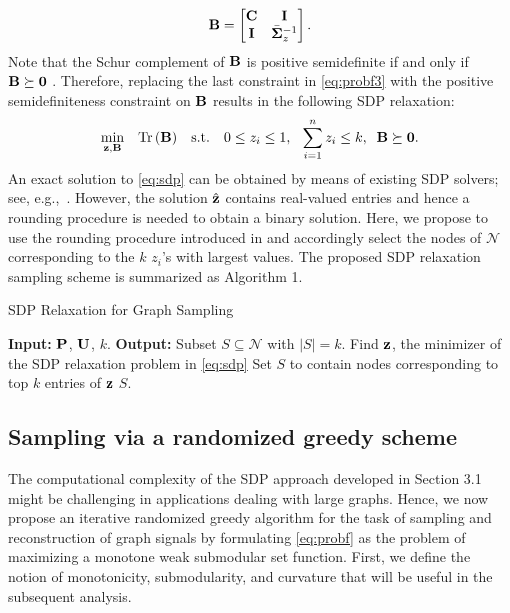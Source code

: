 %
\begin{equation}
\B = \begin{bmatrix}
    \C& \I\\
    \I & \bar{\S}_z^{-1}
\end{bmatrix}.
\end{equation}
%
Note that the Schur complement of $\B$ is positive semidefinite if and only if $\B\succeq \mathbf{0}$ 
\cite{horn2012matrix}. Therefore, replacing the last constraint in \ref{eq:probf3} with the positive semidefiniteness 
constraint on $\B$ results in the following SDP relaxation:
%
\begin{equation}\label{eq:sdp}
\begin{aligned}
& \underset{\z,\B}{\text{min}}
\quad \mathrm{Tr}\left(\B\right)
& \text{s.t.}\quad 0\leq z_i \leq 1, \phantom{k} \sum_{i=1}^nz_i \leq k, \phantom{k} \B \succeq \mathbf{0}.
\end{aligned}
\end{equation}
%
An exact solution to \ref{eq:sdp} can be obtained by means of existing SDP solvers; see, e.g.,~\cite{arora2005fast,grant2008cvx}.  However, the solution $\hat{\z}$ contains real-valued entries and hence a rounding procedure is needed
to obtain a binary solution. Here, we propose to use the rounding procedure introduced in \cite{joshi2009sensor} and accordingly select the nodes of $\mathcal{N}$ corresponding to the $k$ $z_i$'s with largest values. The proposed SDP relaxation sampling scheme is summarized as Algorithm 1.
\renewcommand\algorithmicdo{}	%
\begin{algorithm}[t]
\caption{SDP Relaxation for Graph Sampling}
\label{alg:sdp}
\begin{algorithmic}[1]
    \STATE \textbf{Input:}  $\P$, $\U$, $k$.
    \STATE \textbf{Output:} Subset $S\subseteq \mathcal{N} $ with $|S|=k$.
    \STATE Find $\z$, the minimizer of the SDP relaxation problem in \ref{eq:sdp} 
    \STATE Set $S$ to contain nodes corresponding to top $k$ entries of $\z$
	\RETURN $S$.
\end{algorithmic}
\end{algorithm}
\vspace{-0.25cm}
\subsection{Sampling via a randomized greedy scheme}
The computational complexity of the SDP approach developed in Section 3.1 might be challenging in applications 
dealing with large graphs. Hence, we now propose an iterative randomized greedy algorithm for the task of sampling 
and reconstruction of graph signals by formulating \ref{eq:probf} as the problem of maximizing a monotone weak 
submodular set function. First, we define the notion of monotonicity, submodularity, and curvature that will be useful 
in the subsequent analysis.

